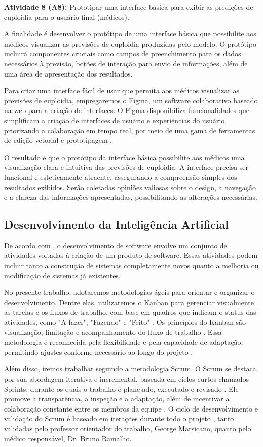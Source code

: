 \textbf{Atividade 8 (A8):} Prototipar uma interface básica para exibir as predições de euploidia para o usuário final (médicos).

A finalidade é desenvolver o protótipo de uma interface básica que possibilite aos médicos visualizar as previsões de euploidia produzidas pelo modelo. O protótipo incluirá componentes cruciais como campos de preenchimento para os dados necessários à previsão, botões de interação para envio de informações, além de uma área de apresentação dos resultados.

Para criar uma interface fácil de usar que permita aos médicos visualizar as previsões de euploidia, empregaremos o Figma, um software colaborativo baseado na web para a criação de interfaces. O Figma disponibiliza funcionalidades que simplificam a criação de interfaces de usuário e experiências do usuário, priorizando a colaboração em tempo real, por meio de uma gama de ferramentas de edição vetorial e prototipagem \cite{figma2024}.

O resultado é que o protótipo da interface básica possibilite aos médicos uma visualização clara e intuitiva das previsões de euploidia. A interface precisa ser funcional e esteticamente atraente, assegurando a compreensão simples dos resultados exibidos. Serão coletadas opiniões valiosas sobre o design, a navegação e a clareza das informações apresentadas, possibilitando as alterações necessárias.

\subsection{Desenvolvimento da Inteligência Artificial}

De acordo com , o desenvolvimento de software envolve um conjunto de atividades voltadas à criação de um produto de software. Essas atividades podem incluir tanto a construção de sistemas completamente novos quanto a melhoria ou modificação de sistemas já existentes.

No presente trabalho, adotaremos metodologias ágeis para orientar e organizar o desenvolvimento. Dentre elas, utilizaremos o Kanban para gerenciar visualmente as tarefas e os fluxos de trabalho, com base em quadros que indicam o status das atividades, como "A fazer", "Fazendo" e "Feito" \cite{kniberg2010}. Os princípios do Kanban são visualização, limitação e acompanhamento do fluxo de trabalho \cite{kniberg2010}. Essa metodologia é reconhecida pela flexibilidade e pela capacidade de adaptação, permitindo ajustes conforme necessário ao longo do projeto \cite{kniberg2010}.

Além disso, iremos trabalhar seguindo a metodologia Scrum. O Scrum se destaca por sua abordagem iterativa e incremental, baseada em ciclos curtos chamados Sprints, durante os quais o trabalho é planejado, executado e revisado \cite{schwaber2010}. Ele promove a transparência, a inspeção e a adaptação, além de incentivar a colaboração constante entre os membros da equipe \cite{schwaber2010}. O ciclo de desenvolvimento e validação do Scrum é baseado em iterações durante todo o projeto \cite{schwaber2010}, tanto validadas pelo professor orientador do trabalho, George Marsicano, quanto pelo médico responsável, Dr. Bruno Ramalho.